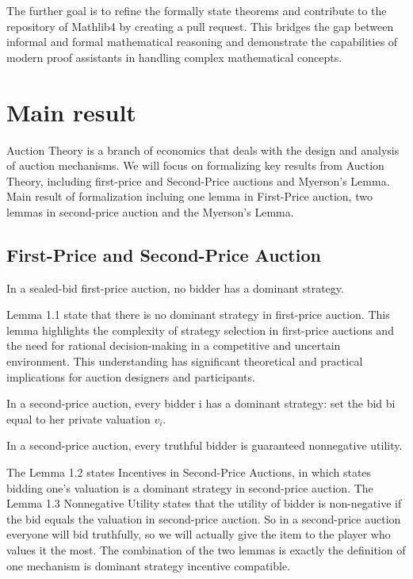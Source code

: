 The further goal is to refine the formally state theorems and contribute to the repository of Mathlib4 by creating a pull request. This bridges the gap between informal and formal mathematical reasoning and demonstrate the capabilities of modern proof assistants in handling complex mathematical concepts.


\section{Main result}
Auction Theory is a branch of economics that deals with the design and analysis of auction mechanisms. We will focus on formalizing key results from Auction Theory, including first-price and Second-Price auctions and Myerson's Lemma. Main result of formalization incluing one lemma in First-Price auction, two lemmas in second-price auction and the Myerson's Lemma.

\subsection{First-Price and Second-Price Auction}

\begin{lemma}
In a sealed-bid first-price auction, no bidder has a dominant strategy.
\end{lemma}
Lemma 1.1 state that there is no dominant strategy in first-price auction. This lemma highlights the complexity of strategy selection in first-price auctions and the need for rational decision-making in a competitive and uncertain environment. This understanding has significant theoretical and practical implications for auction designers and participants.

\begin{lemma}
In a second-price auction, every bidder i has a dominant strategy: set the bid bi equal to her private valuation \(v_i\).
\end{lemma}
\begin{lemma} In a second-price auction, every truthful bidder is guaranteed nonnegative utility.
\end{lemma}
The Lemma 1.2 states Incentives in Second-Price Auctions, in which states bidding one's valuation is a dominant strategy in second-price auction. The Lemma 1.3 Nonnegative Utility states that the utility of bidder is non-negative if the bid equals the valuation in second-price auction. So in a second-price auction everyone will bid truthfully, so we will actually give the item to the player who values it the most. The combination of the two lemmas is exactly the definition of one mechanism is dominant strategy incentive compatible.


